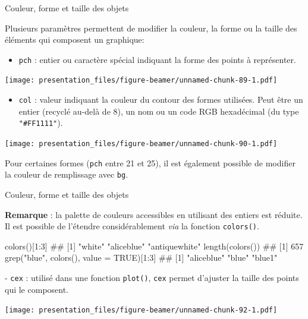 \documentclass[12pt,handout,ignorenonframetext,]{beamer}
\newenvironment{Shaded}{}{}
\newcommand{\KeywordTok}[1]{\textcolor[rgb]{0.00,0.00,1.00}{{#1}}}
\newcommand{\DataTypeTok}[1]{{#1}}
\newcommand{\DecValTok}[1]{{#1}}
\newcommand{\StringTok}[1]{\textcolor[rgb]{0.00,0.50,0.50}{{#1}}}
\newcommand{\OtherTok}[1]{\textcolor[rgb]{1.00,0.25,0.00}{{#1}}}
\newcommand{\NormalTok}[1]{{#1}}
\providecommand{\tightlist}{%
\setlength{\itemsep}{0pt}\setlength{\parskip}{0pt}}
\renewenvironment{Shaded}{\begin{snugshade}}{\end{snugshade}}
\begin{document}
\begin{frame}[fragile]{Couleur, forme et taille des objets}

Plusieurs paramètres permettent de modifier la couleur, la forme ou la
taille des éléments qui composent un graphique:

\begin{itemize}
\tightlist
\item
  \pause \texttt{pch} : entier ou caractère spécial indiquant la forme
  des points à représenter.
\end{itemize}

\texttt{[image: presentation\_files/figure-beamer/unnamed-chunk-89-1.pdf]}

\begin{itemize}
\tightlist
\item
  \pause \texttt{col} : valeur indiquant la couleur du contour des
  formes utilisées. Peut être un entier (recyclé au-delà de 8), un nom
  ou un code RGB hexadécimal (du type \texttt{"\#FF1111"}). \small  
\end{itemize}

\texttt{[image: presentation\_files/figure-beamer/unnamed-chunk-90-1.pdf]}

Pour certaines formes (\texttt{pch} entre 21 et 25), il est également
possible de modifier la couleur de remplissage avec \texttt{bg}.

\end{frame}

\begin{frame}[fragile]{Couleur, forme et taille des objets}

\textbf{Remarque} : la palette de couleurs accessibles en utilisant des
entiers est réduite. Il est possible de l'étendre considérablement
\emph{via} la fonction \texttt{colors()}.

\small

\begin{Shaded}
\begin{Highlighting}[]
\KeywordTok{colors}\NormalTok{()[}\DecValTok{1}\NormalTok{:}\DecValTok{3}\NormalTok{]}
  \NormalTok{## [1] "white"        "aliceblue"    "antiquewhite"}
\KeywordTok{length}\NormalTok{(}\KeywordTok{colors}\NormalTok{())}
  \NormalTok{## [1] 657}
\KeywordTok{grep}\NormalTok{(}\StringTok{"blue"}\NormalTok{, }\KeywordTok{colors}\NormalTok{(), }\DataTypeTok{value =} \OtherTok{TRUE}\NormalTok{)[}\DecValTok{1}\NormalTok{:}\DecValTok{3}\NormalTok{]}
  \NormalTok{## [1] "aliceblue" "blue"      "blue1"}
\end{Highlighting}
\end{Shaded}

\pause \normalsize
- \texttt{cex} : utilisé dans une fonction \texttt{plot()}, \texttt{cex}
permet d'ajuster la taille des points qui le composent.

\texttt{[image: presentation\_files/figure-beamer/unnamed-chunk-92-1.pdf]}

\end{frame}
\end{document}
